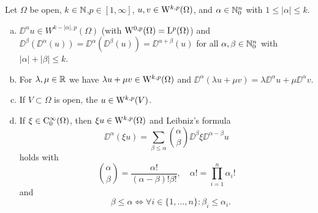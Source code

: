 \begin{prop}
  \label{prop:sobolevProperties}
  Let $\Omega$ be open, $k \in \mathbb{N}$,$p \in [1,\infty]$, $u,v \in \mathrm{W}^{k,p}(\Omega)$, and $\alpha \in \mathbb{N}_0^n$ with $1 \leq |\alpha| \leq k$.
  \begin{enumerate}[a)]
    \item $\DD^\alpha u \in W^{k - |\alpha|,p}(\Omega)$ (with $\mathrm{W}^{0,p}(\Omega) = \mathrm{L}^p(\Omega)$) and $\DD^\beta (\DD^\alpha (u)) = \DD^\alpha (\DD^\beta(u)) = \DD^{\alpha + \beta}(u)$ for all $\alpha, \beta \in \mathbb{N}_0^n$ with $|\alpha| + |\beta| \leq k$.
    \item For $\lambda, \mu \in \mathbb{R}$ we have $\lambda u + \mu v \in \mathrm{W}^{k,p}(\Omega)$ and $\DD^\alpha(\lambda u + \mu v) = \lambda \DD^\alpha u + \mu \DD^\alpha v$.
    \item If $V \subset \Omega$ is open, the $u \in \mathrm{W}^{k,p}(V)$.
    \item If $\xi \in \mathrm{C}_0^\infty(\Omega)$, then $\xi u \in \mathrm{W}^{k,p}(\Omega)$ and Leibniz's formula
      $$
      \DD^\alpha(\xi u) = \sum_{\beta \leq \alpha} \binom{\alpha}{\beta} \DD^\beta\xi \DD^{\alpha - \beta} u
      $$
      holds with 
      $$\binom{\alpha}{\beta} = \frac{\alpha!}{(\alpha -\beta)! \beta!}, \quad \alpha! = \prod_{i = 1}^n \alpha_i!$$
      and
      $$\quad \beta \leq \alpha \iff \forall i \in \{1,\dots,n\}\colon \beta_i \leq \alpha_i.$$
  \end{enumerate}
\end{prop}

